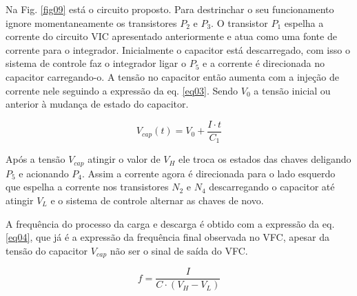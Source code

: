 Na Fig. \ref{fig09} está o circuito proposto. Para destrinchar o seu funcionamento ignore momentaneamente os transistores $P_2$ e $P_3$. O transistor $P_1$ espelha a corrente do circuito VIC apresentado anteriormente e atua como uma fonte de corrente para o integrador. 
Inicialmente o capacitor está descarregado, com isso o sistema de controle faz o integrador ligar o $P_5$ e a corrente é direcionada no capacitor carregando-o. 
A tensão no capacitor então aumenta com a injeção de corrente nele seguindo a expressão da eq. \ref{eq03}. Sendo $V_0$ a tensão inicial ou anterior à mudança de estado do capacitor.

\begin{equation}
V_{cap}(t) = V_0 + \frac{I\cdot t}{C_1}
 \label{eq03}
\end{equation}

Após a tensão $V_{cap}$ atingir o valor de $V_H$ ele troca os estados das chaves deligando $P_5$ e acionando $P_4$. 
Assim a corrente agora é direcionada para o lado esquerdo que espelha a corrente nos transistores $N_2$ e $N_4$ descarregando o capacitor até atingir $V_L$ e o sistema de controle alternar as chaves de novo.  


A frequência do processo da carga e descarga é obtido com a expressão da eq. \ref{eq04}, que já é a expressão da frequência final observada no VFC, apesar da tensão do capacitor $V_{cap}$ não ser o sinal de saída do VFC. 

\begin{equation}
f = \frac{I}{C\cdot(V_H - V_L)}
 \label{eq04}
\end{equation}

